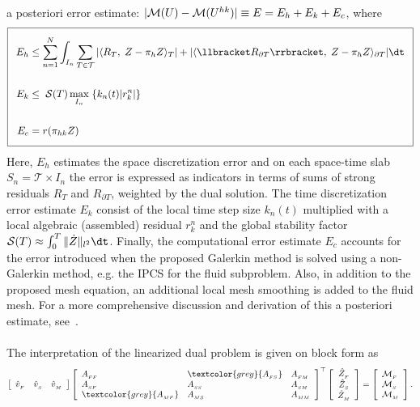 a posteriori error estimate: $|\mathcal{M}(U) - \mathcal{M}(U^{hk})| \equiv E = E_h + E_k
+ E_c$, where
\begin{equation}
\label{selim:eq:aposteriori}
\addtolength{\fboxsep}{5pt} \boxed{
\begin{split}
E_h &\leq \sum_{n=1}^{N}\int_{I_n} \sum_{T\in\mathcal{T}}| \langle
R_T,\; Z - \pi_h Z \rangle_T |+ | \langle \llbracket R_{\partial T}
\rrbracket,\; Z - \pi_h Z \rangle _{\partial T}|\dt\\\\ E_k &\leq
\;\mathcal{S}(T)\max_{I_n}\;\{k_n(t) | r_k ^n|\}\\\\ E_c &=
r(\pi_{hk}Z)
\end{split}
}
\end{equation}
Here, $E_h$ estimates the space discretization error and on each
space-time slab $S_n = \mathcal{T} \times I_n$ the error is expressed
as indicators in terms of sums of strong residuals $R_T$ and
$R_{\partial T}$, weighted by the dual solution.  The time
discretization error estimate $E_k$ consist of the local time step
size $k_n(t)$ multiplied with a local algebraic (assembled) residual
$r_k^n$ and the global stability factor $\mathcal{S}(T) \approx
\int_0^T \| \dot{Z} \|_{l^2}\dt$. Finally, the computational error
estimate $E_c$ accounts for the error introduced when the proposed
Galerkin method is solved using a non-Galerkin method, e.g. the IPCS
for the fluid subproblem. Also, in addition to the proposed mesh
equation, an additional local mesh smoothing is added to the fluid mesh.
For a more comprehensive discussion and derivation of this a
posteriori estimate, see~\cite{SelimNarayananEtAl2010}.
\\\\
The interpretation of the linearized dual problem is given on block form as
\begin{eqnarray}
\label{selim:eq:dualsystem}
\left[\begin{array}{ccc} \hat{v}_{_{F}} & \hat{v}_{_{S}} & \hat{v}_{_{M}}
  \end{array} \right]
\left[\begin{array}{lll} \AFF & \textcolor{grey}{\AFS} & \AFM
    \\ \ASF & \ASS & \ASM \\ \textcolor{grey}{\AMF} & \AMS &
    \AMM
\end{array} \right]^{\top}
\left[ \begin{array}{c} \hat{Z}_{_{F}} \\ \hat{Z}_{_{S}}
    \\ \hat{Z}_{_{M}} \end{array} \right] =\left[ \begin{array}{l}
    \M_{_{F}}\\ \M_{{_S}}\\ \M_{_{M}} \end{array} \right]. 
\end{eqnarray}
